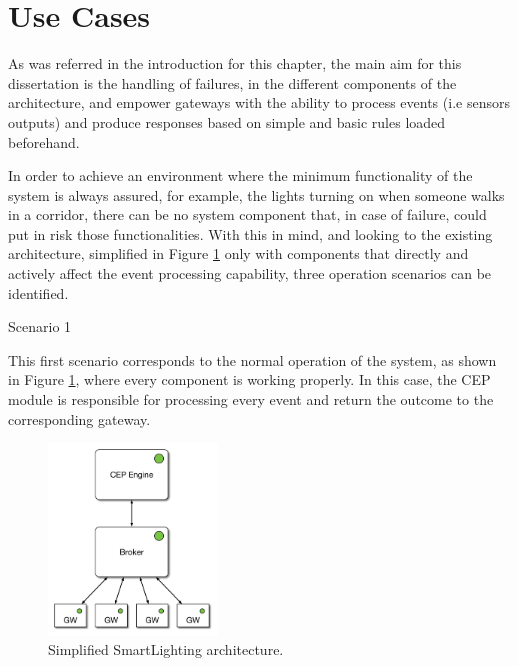\section{Use Cases}
\label{Architecture:usecases}

As was referred in the introduction for this chapter, the main aim for this dissertation is the handling of failures, in the different components of the architecture, and empower gateways with the ability to process events (i.e sensors outputs) and produce responses based on simple and basic rules loaded beforehand.

In order to achieve an environment where the minimum functionality of the system is always assured, for example, the lights turning on when someone walks in a corridor, there can be no system component that, in case of failure, could put in risk those functionalities. With this in mind, and looking to the existing architecture, simplified in Figure \ref{fig:sc1} only with components that directly and actively affect the event processing capability, three operation scenarios can be identified. 



\begin{Paragraph}{Scenario 1}
	
	This first scenario corresponds to the normal operation of the system, as shown in Figure \ref{fig:sc1}, where every component is working properly. In this case, the CEP module is responsible for processing every event and return the outcome to the corresponding gateway.
	 
	 \begin{figure}[H]
	 	\centering
	 	\includegraphics[width=0.4\textwidth]{figures/sc1.png}
	 	\caption{Simplified SmartLighting architecture. }
	 	\label{fig:sc1}
	 \end{figure}
	 
\end{Paragraph}

